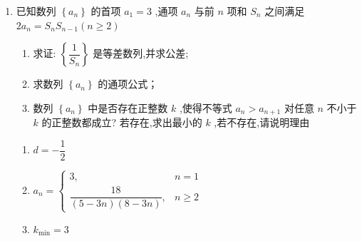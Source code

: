 \begin{enumerate}
\begin{jieda}
\begin{enumerate}
            因为 ${a}_{n + 1} - {a}_{n} = 2\left( {n + 1}\right)  - {2n} = 2$ ,所以 $\left\{  {a}_{n}\right\}$ 是以 ${a}_{1} = 2$ 为首项, 2 为公差的等差数列；
            \item 由 ${c}_{n} = \left\{  \begin{matrix} \dfrac{1}{n\left( {n + 2}\right) } & n\text{ 为奇数 } \\  {a}_{n} & n\text{ 为偶数 } \end{matrix}\right.$,
        \end{enumerate}
    \end{jieda}
    
    \item 已知数列 $\left\{  {a}_{n}\right\}$ 的首项 ${a}_{1} = 3$ ,通项 ${a}_{n}$ 与前 $n$ 项和 ${S}_{n}$ 之间满足 $2{a}_{n} = {S}_{n}{S}_{n - 1}\left( {n \geq  2}\right)$
    \begin{enumerate}
        \item 求证: $\left\{  \dfrac{1}{{S}_{n}}\right\}$ 是等差数列,并求公差;
        \item 求数列 $\left\{  {a}_{n}\right\}$ 的通项公式；
        \item 数列 $\left\{  {a}_{n}\right\}$ 中是否存在正整数 $k$ ,使得不等式 ${a}_{n} > {a}_{n + 1}$ 对任意 $n$ 不小于 $k$ 的正整数都成立? 若存在,求出最小的 $k$ ,若不存在,请说明理由
    \end{enumerate}
    \begin{jieda}
        \begin{enumerate}
            \item $d =  - \dfrac{1}{2}$
            \item ${a}_{n} = \left\{  \begin{array}{ll} 3, & n = 1 \\  \dfrac{18}{\left( {5 - {3n}}\right) \left( {8 - {3n}}\right) }, & n \geq  2 \end{array}\right.$
            \item ${k}_{\min } = 3$
        \end{enumerate}
    \end{jieda}


\end{enumerate}
